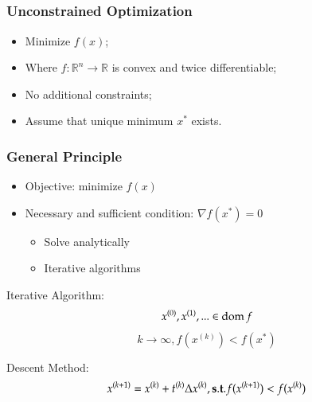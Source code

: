 

\newcommand\desmeth{x^{(k+1)} = x^{(k)} + t^{(k)}\Delta x^{(k)}}
\newcommand\satis{{\bf \small s.t}.   f(x^{(k+1)}) < f(x^{(k)})}
\newcommand\xk[1]{x^{(#1)}}
\newcommand\bx{{\bf x}}

\subsection{}
\begin{frame}
  \frametitle{Unconstrained Optimization}
  \begin{itemize}
  \item Minimize $f(x)$;
  \item Where $f : \mathbb{R}^n \rightarrow \mathbb{R}$ is convex
    and twice differentiable;
  \item No additional constraints;
  \item Assume that unique minimum $x^*$ exists.
  \end{itemize}
\end{frame}

\begin{frame}
  \frametitle{General Principle}
  \begin{itemize}
  \item Objective: minimize $f(x)$
  \item Necessary and sufficient condition: $\nabla f(x^*) = 0$
    \begin{itemize}
    \item Solve analytically
    \item Iterative algorithms
    \end{itemize}
  \end{itemize}

  \begin{block}{ Iterative Algorithm:}
    $$\xk{0}, \xk{1}, ... \in \dom f$$
    $$k \rightarrow \infty, f(\xk{k}) < f(x^*) $$
  \end{block}

  \begin{block}{Descent Method:}
    $$\desmeth,  \satis$$
  \end{block}

\end{frame}



